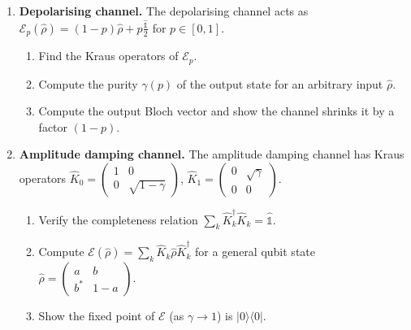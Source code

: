 \documentclass[11pt,a4paper]{article}
\begin{document}
\begin{tcolorbox}[gradprobbox, title={Part C --- Quantum Channels and Maps \hfill\normalfont 3 problems}]

\begin{enumerate}[leftmargin=1.8em, label=\textbf{C\arabic*.}, itemsep=12pt]

\item {}
  \textbf{Depolarising channel.}
  The depolarising channel acts as
  $\mathcal{E}_p(\hat{\rho})=(1-p)\hat{\rho}+p\tfrac{\hat{\mathbb{1}}}{2}$
  for $p\in[0,1]$.
  \begin{enumerate}[label=(\alph*)]
    \item Find the Kraus operators of $\mathcal{E}_p$.
    \item Compute the purity $\gamma(p)$ of the output state for an arbitrary input $\hat{\rho}$.
    \item Compute the output Bloch vector and show the channel shrinks it by a factor $(1-p)$.
  \end{enumerate}

\item {}
  \textbf{Amplitude damping channel.}
  The amplitude damping channel has Kraus operators
  $\hat{K}_0=\begin{pmatrix}1&0\\0&\sqrt{1-\gamma}\end{pmatrix}$,
  $\hat{K}_1=\begin{pmatrix}0&\sqrt{\gamma}\\0&0\end{pmatrix}$.
  \begin{enumerate}[label=(\alph*)]
    \item Verify the completeness relation $\sum_k\hat{K}_k^\dagger\hat{K}_k=\hat{\mathbb{1}}$.
    \item Compute $\mathcal{E}(\hat{\rho})=\sum_k\hat{K}_k\hat{\rho}\hat{K}_k^\dagger$ for
          a general qubit state $\hat{\rho}=\begin{pmatrix}a&b\\b^*&1-a\end{pmatrix}$.
    \item Show the fixed point of $\mathcal{E}$ (as $\gamma\to 1$) is $|0\rangle\langle 0|$.
  \end{enumerate}


\end{enumerate}
\end{tcolorbox}
\end{document}
